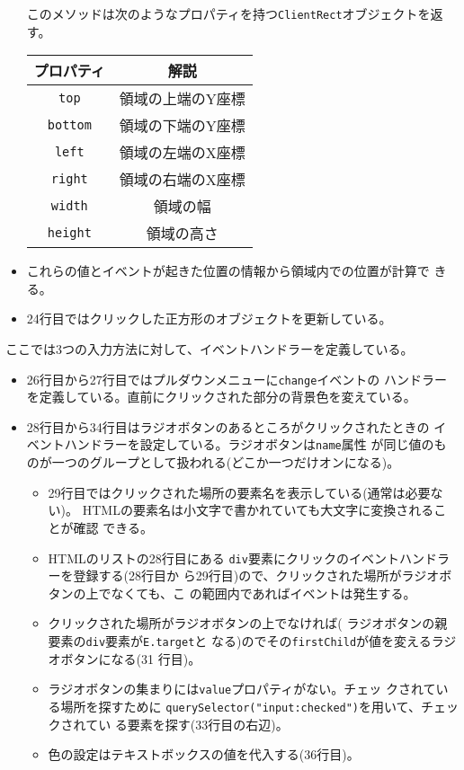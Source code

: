 \begin{Exec}
\begin{itemize}
       このメソッドは次のようなプロパティを持つ\texttt{ClientRect}オブジェクトを返す。
\begin{center}
\begin{tabular}{|c|c|}\hline
プロパティ&\multicolumn{1}{c|}{解説} \\\hline
 \texttt{top}&領域の上端のY座標 \\\hline
 \texttt{bottom}&領域の下端のY座標 \\\hline
 \texttt{left}& 領域の左端のX座標\\\hline
 \texttt{right}& 領域の右端のX座標\\\hline
 \texttt{width}& 領域の幅\\\hline
 \texttt{height}& 領域の高さ\\\hline
\end{tabular}
\end{center}
 \item これらの値とイベントが起きた位置の情報から領域内での位置が計算で
       きる。
 \item 24行目ではクリックした正方形のオブジェクトを更新している。
\end{itemize}
ここでは3つの入力方法に対して、イベントハンドラーを定義している。
 \begin{itemize}
 \item 26行目から27行目ではプルダウンメニューに\texttt{change}イベントの
       ハンドラーを定義している。直前にクリックされた部分の背景色を変えている。
 \item 28行目から34行目はラジオボタンのあるところがクリックされたときの
       イベントハンドラーを設定している。ラジオボタンは\texttt{name}属性
       が同じ値のものが一つのグループとして扱われる(どこか一つだけオンになる)。
\begin{itemize}
 \item 29行目ではクリックされた場所の要素名を表示している(通常は必要ない)。
       HTMLの要素名は小文字で書かれていても大文字に変換されることが確認
       できる。
 \item HTMLのリストの28行目にある
       \texttt{div}要素にクリックのイベントハンドラーを登録する(28行目か
       ら29行目)ので、クリックされた場所がラジオボタンの上でなくても、こ
       の範囲内であればイベントは発生する。
 \item クリックされた場所がラジオボタンの上でなければ(
       ラジオボタンの親要素の\texttt{div}要素が\texttt{E.target}と
       なる)のでその\texttt{firstChild}が値を変えるラジオボタンになる(31
       行目)。
 \item ラジオボタンの集まりには\texttt{value}プロパティがない。チェッ
       クされている場所を探すために
       \texttt{querySelector("input:checked")}を用いて、チェックされてい
       る要素を探す(33行目の右辺)。
 \item 色の設定はテキストボックスの値を代入する(36行目)。
\end{itemize}
 \end{itemize}
\end{Exec}
